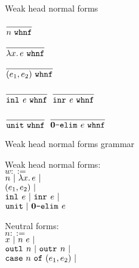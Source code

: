 \documentclass{beamer}
\begin{document}
\begin{frame}{Weak head normal forms}

\begin{center}
  $\displaystyle \frac{}{n\ \texttt{whnf}} \textsc{\footnotesize{}}$

  \vspace{2em}

  $\infrule{}{\whnf{\fun{x}{e}}}$

  \vspace{2em}

  $\displaystyle \frac{}{(e_1, e_2)\ \texttt{whnf}} \textsc{\footnotesize{}}$

  \vspace{2em}

  $\displaystyle \frac{}{\texttt{inl}_{}\ e\ \texttt{whnf}} \textsc{\footnotesize{}}$ \quad
  $\displaystyle \frac{}{\texttt{inr}_{}\ e\ \texttt{whnf}} \textsc{\footnotesize{}}$ \quad

  \vspace{2em}

  $\displaystyle \frac{}{\texttt{unit}\ \texttt{whnf}} \textsc{\footnotesize{}}$ \quad
  $\displaystyle \frac{}{\textbf{0}\texttt{-elim}_{}\ e\ \texttt{whnf}} \textsc{\footnotesize{}}$
\end{center}

\end{frame}

\begin{frame}{Weak head normal forms grammar}

Weak head normal forms: \\
$w ::=$ \\
\qquad $n \pipe \fun{x}{e} \pipe$ \\
\qquad $(e_1, e_2) \ |\ $ \\
\qquad $\texttt{inl}_{}\ e \ |\  \texttt{inr}_{}\ e \ |\ $ \\
\qquad $\texttt{unit} \ |\  \textbf{0}\texttt{-elim}_{}\ e$

\vspace{2em}

Neutral forms: \\
$n ::=$ \\
\qquad $x \pipe \app{n}{e} \pipe$ \\
\qquad $\texttt{outl}_{}\ n \ |\  \texttt{outr}_{}\ n \ |\ $ \\
\qquad $\texttt{case}\ n\ \texttt{of}\ (e_1, e_2) \ |\ $ \\

\end{frame}
\end{document}
